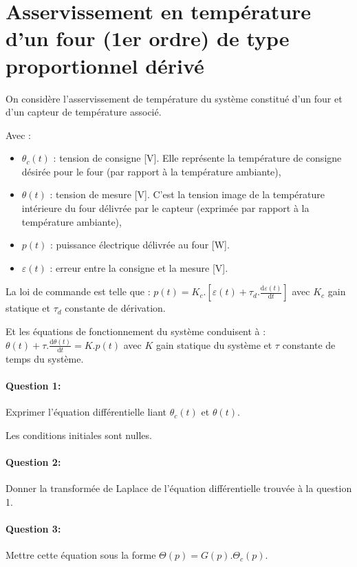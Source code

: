 \newpage

\section{Asservissement en température d'un four (1er ordre) de type proportionnel dérivé}

On considère l'asservissement de température du système constitué d'un four et d'un capteur de température associé.

Avec : 
\begin{itemize}
 \item $\theta_c(t)$ : tension de consigne [V]. Elle représente la température de consigne désirée pour le four (par rapport à la température ambiante),
 \item $\theta(t)$ : tension de mesure [V]. C'est la tension image de la température intérieure du four délivrée par le capteur (exprimée par rapport à la température ambiante),
 \item $p(t)$ : puissance électrique délivrée au four [W]. 
 \item $\varepsilon(t)$ : erreur entre la consigne et la mesure [V].
\end{itemize}

La loi de commande est telle que : 
$p(t)=K_c.[\varepsilon(t)+\tau_d.\frac{\mathrm{d}\varepsilon(t)}{\mathrm{d}t}]$ avec $K_c$ gain statique et $\tau_d$ constante de dérivation.

Et les équations de fonctionnement du système conduisent à :
$\theta(t)+\tau.\frac{\mathrm{d}\theta(t)}{\mathrm{d}t}=K.p(t)$
avec $K$ gain statique du système et $\tau$ constante de temps du système.

\paragraph{Question 1:} Exprimer l'équation différentielle liant $\theta_c(t)$ et $\theta(t)$.

Les conditions initiales sont nulles.

\paragraph{Question 2:} Donner la transformée de Laplace de l'équation différentielle trouvée à la question 1.

\paragraph{Question 3:} Mettre cette équation sous la forme $\Theta(p)=G(p).\Theta_c(p)$.

